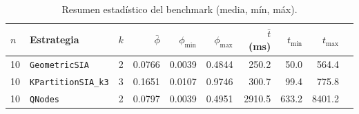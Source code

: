 \begin{table}[H]
  \centering
  \caption{Resumen estadístico del benchmark (media, mín, máx).}
  \label{tab:bench_summary}
  \small
  \begin{tabular}{llrrrrrrrr}
    \toprule
    $n$ & Estrategia & $k$ & $\bar\phi$ & $\phi_\min$ & $\phi_\max$ & $\bar t$ (ms) & $t_\min$ & $t_\max$ \\
    \midrule
    10 & \texttt{GeometricSIA} & 2 & 0.0766 & 0.0039 & 0.4844 & 250.2 & 50.0 & 564.4 \\
    10 & \texttt{KPartitionSIA_k3} & 3 & 0.1651 & 0.0107 & 0.9746 & 300.7 & 99.4 & 775.8 \\
    10 & \texttt{QNodes} & 2 & 0.0797 & 0.0039 & 0.4951 & 2910.5 & 633.2 & 8401.2 \\
    \bottomrule
  \end{tabular}
\end{table}